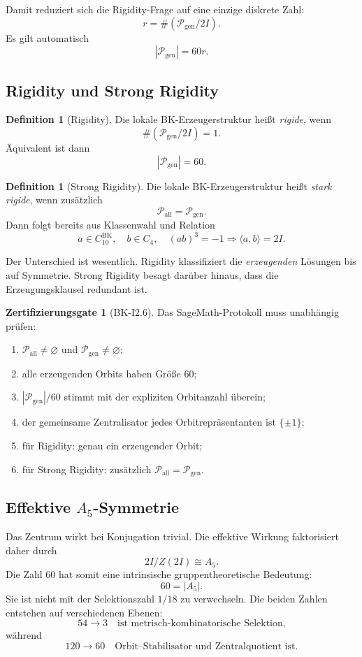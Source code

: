 \documentclass[11pt,a4paper]{article}
\theoremstyle{definition}
\newtheorem{definition}[satz]{Definition}
\newtheorem{gate}[satz]{Zertifizierungsgate}
\newcommand{\twoI}{2I}
\newcommand{\Pgen}{\mathcal P_{\mathrm{gen}}}
\newcommand{\Pall}{\mathcal P_{\mathrm{all}}}
\begin{document}
Damit reduziert sich die Rigidity-Frage auf eine einzige diskrete Zahl:
\[
r=\#(\Pgen/\twoI).
\]
Es gilt automatisch
\[
|\Pgen|=60r.
\]

\subsection{Rigidity und Strong Rigidity}

\begin{definition}[Rigidity]
Die lokale BK-Erzeugerstruktur heißt \emph{rigide}, wenn
\[
\#(\Pgen/\twoI)=1.
\]
Äquivalent ist dann
\[
|\Pgen|=60.
\]
\end{definition}

\begin{definition}[Strong Rigidity]
Die lokale BK-Erzeugerstruktur heißt \emph{stark rigide}, wenn zusätzlich
\[
\Pall=\Pgen.
\]
Dann folgt bereits aus Klassenwahl und Relation
\[
a\in C_{10}^{\mathrm{BK}},\quad
b\in C_4,\quad
(ab)^3=-1
\Longrightarrow
\langle a,b\rangle=\twoI.
\]
\end{definition}

Der Unterschied ist wesentlich. Rigidity klassifiziert die \emph{erzeugenden} Lösungen bis auf Symmetrie. Strong Rigidity besagt darüber hinaus, dass die Erzeugungsklausel redundant ist.

\begin{gate}[BK-I2.6]
Das SageMath-Protokoll muss unabhängig prüfen:
\begin{enumerate}
\item \(\Pall\neq\varnothing\) und \(\Pgen\neq\varnothing\);
\item alle erzeugenden Orbits haben Größe \(60\);
\item \(|\Pgen|/60\) stimmt mit der expliziten Orbitanzahl überein;
\item der gemeinsame Zentralisator jedes Orbitrepräsentanten ist \(\{\pm1\}\);
\item für Rigidity: genau ein erzeugender Orbit;
\item für Strong Rigidity: zusätzlich \(\Pall=\Pgen\).
\end{enumerate}
\end{gate}

\subsection{Effektive \(A_5\)-Symmetrie}

Das Zentrum wirkt bei Konjugation trivial. Die effektive Wirkung faktorisiert daher durch
\[
\twoI/Z(\twoI)\cong A_5.
\]
Die Zahl \(60\) hat somit eine intrinsische gruppentheoretische Bedeutung:
\[
60=|A_5|.
\]
Sie ist nicht mit der Selektionszahl \(1/18\) zu verwechseln. Die beiden Zahlen entstehen auf verschiedenen Ebenen:
\[
54\to3\quad\text{ist metrisch-kombinatorische Selektion,}
\]
während
\[
120\to60\quad\text{Orbit--Stabilisator und Zentralquotient ist.}
\]
\end{document}
